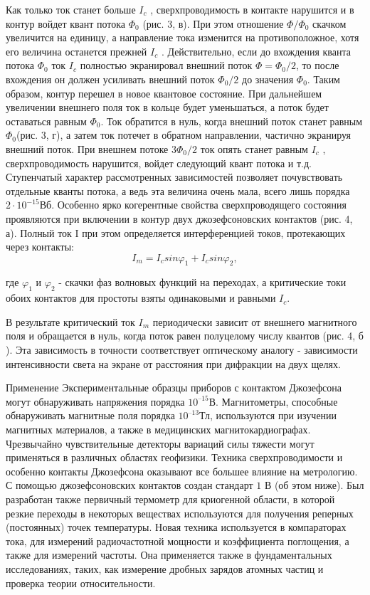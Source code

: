 \documentclass[a4paper,14pt]{article}
\begin{document}
Как только ток станет больше $I_c$ , сверхпроводимость в контакте нарушится и в контур войдет квант потока $\Phi_0$ (рис. 3, в). При этом отношение $\Phi / \Phi_0$ скачком увеличится на единицу, а направление тока изменится на противоположное, хотя его величина останется прежней $I_c$ . Действительно, если до вхождения кванта потока $\Phi_0$ ток $I_c$ полностью экранировал внешний поток $\Phi = \Phi_0 / 2$, то после вхождения он должен усиливать внешний поток $\Phi_0 / 2$ до значения $\Phi_0$. Таким образом, контур перешел в новое квантовое состояние.
При дальнейшем увеличении внешнего поля ток в кольце будет уменьшаться, а поток будет оставаться равным $\Phi_0$. Ток обратится в нуль, когда внешний поток станет равным $\Phi_0$(рис. 3, г), а затем ток потечет в обратном направлении, частично экранируя внешний поток. При внешнем потоке $3 \Phi_0 / 2$ ток опять станет равным $I_c$ , сверхпроводимость нарушится, войдет следующий квант потока и т.д. Ступенчатый характер рассмотренных зависимостей позволяет почувствовать отдельные кванты потока, а ведь эта величина очень мала, всего лишь порядка $2 \cdot 10^{-15}$Вб. 
Особенно ярко когерентные свойства сверхпроводящего состояния проявляются при включении в контур двух джозефсоновских контактов (рис. 4, а). Полный ток I при этом определяется интерференцией токов, протекающих через контакты: 
\begin{equation*}
	I_m = I_c sin \varphi_1 + I_c sin \varphi_2,
\end{equation*}

где $\varphi_1$ и $\varphi_2$ - скачки фаз волновых функций на переходах, а критические токи обоих контактов для простоты взяты одинаковыми и равными $I_c$. 

В результате критический ток $I_m$ периодически зависит от внешнего магнитного поля и обращается в нуль, когда поток равен полуцелому числу квантов (рис. 4, б ). Эта зависимость в точности соответствует оптическому аналогу - зависимости интенсивности света на экране от расстояния при дифракции на двух щелях. 
    
Применение 
Экспериментальные образцы приборов с контактом Джозефсона могут обнаруживать напряжения порядка $10^{–15}$В.  Магнитометры, способные обнаруживать магнитные поля порядка $10^{–13}$Тл, используются при изучении магнитных материалов, а также в медицинских магнитокардиографах. Чрезвычайно чувствительные детекторы вариаций силы тяжести могут применяться в различных областях геофизики. 
Техника сверхпроводимости и особенно контакты Джозефсона оказывают все большее влияние на метрологию. С помощью джозефсоновских контактов создан стандарт $1$ В (об этом ниже). Был разработан также первичный термометр для криогенной области, в которой резкие переходы в некоторых веществах используются для получения реперных (постоянных) точек температуры. Новая техника используется в компараторах тока, для измерений радиочастотной мощности и коэффициента поглощения, а также для измерений частоты. Она применяется также в фундаментальных исследованиях, таких, как измерение дробных зарядов атомных частиц и проверка теории относительности.
\end{document}
